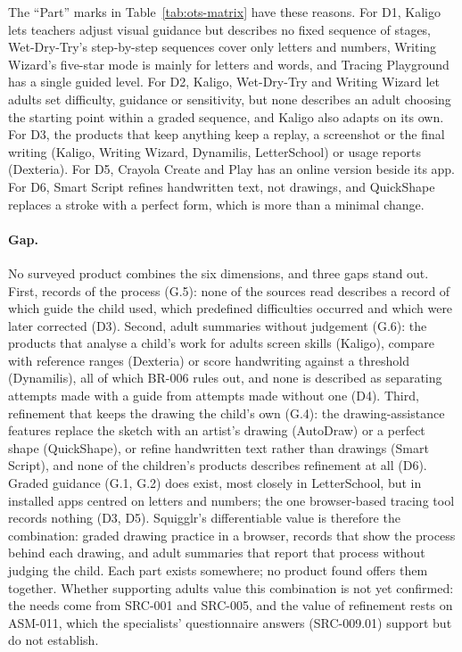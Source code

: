 \documentclass[12pt]{article}
\renewcommand{\_}{\textunderscore\allowbreak}%
\begin{document}
The ``Part'' marks in Table~\ref{tab:ots-matrix} have these reasons. For D1,
Kaligo lets teachers adjust visual guidance but describes no fixed sequence of
stages, Wet-Dry-Try's step-by-step sequences cover only letters and numbers,
Writing Wizard's five-star mode is mainly for letters and words, and Tracing
Playground has a single guided level. For D2, Kaligo, Wet-Dry-Try and Writing
Wizard let adults set difficulty, guidance or sensitivity, but none describes an
adult choosing the starting point within a graded sequence, and Kaligo also
adapts on its own. For D3, the products that keep anything keep a replay, a
screenshot or the final writing (Kaligo, Writing Wizard, Dynamilis,
LetterSchool) or usage reports (Dexteria). For D5, Crayola Create and Play has
an online version beside its app. For D6, Smart Script refines handwritten text,
not drawings, and QuickShape replaces a stroke with a perfect form, which is
more than a minimal change.

\paragraph{Gap.}
No surveyed product combines the six dimensions, and three gaps stand out.
First, records of the process (G.5): none of the sources read describes a record
of which guide the child used, which predefined difficulties occurred and which
were later corrected (D3). Second, adult summaries without judgement (G.6): the
products that analyse a child's work for adults screen skills (Kaligo), compare
with reference ranges (Dexteria) or score handwriting against a threshold
(Dynamilis), all of which BR-006 rules out, and none is described as separating
attempts made with a guide from attempts made without one (D4). Third,
refinement that keeps the drawing the child's own (G.4): the drawing-assistance
features replace the sketch with an artist's drawing (AutoDraw) or a perfect
shape (QuickShape), or refine handwritten text rather than drawings (Smart
Script), and none of the children's products describes refinement at all (D6).
Graded guidance (G.1, G.2) does exist, most closely in LetterSchool, but in
installed apps centred on letters and numbers; the one browser-based tracing
tool records nothing (D3, D5). Squigglr's differentiable value is therefore the
combination: graded drawing practice in a browser, records that show the process
behind each drawing, and adult summaries that report that process without
judging the child. Each part exists somewhere; no product found offers them
together. Whether supporting adults value this combination is not yet confirmed:
the needs come from SRC-001 and SRC-005, and the value of refinement rests on
ASM-011, which the specialists' questionnaire answers (SRC-009.01) support but
do not establish.
\end{document}
